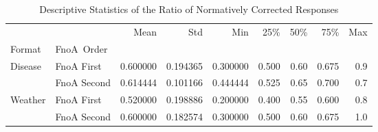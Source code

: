 \begin{table}[h!]
    \centering
    \caption{Descriptive Statistics of the Ratio of Normatively Corrected Responses}
    \label{descriptives}
        \begin{tabular}{llrrrrrrr}
        \toprule
                &             &        Mean &       Std &       Min &    25\% &   50\% &    75\% &  Max \\
        Format & FnoA\ Order &                 &           &           &        &       &        &      \\
        \midrule
        Disease & FnoA First &     0.600000 &  0.194365 &  0.300000 &  0.500 &  0.60 &  0.675 &  0.9 \\
                & FnoA Second &     0.614444 &  0.101166 &  0.444444 &  0.525 &  0.65 &  0.700 &  0.7 \\
        Weather & FnoA First &    0.520000 &  0.198886 &  0.200000 &  0.400 &  0.55 &  0.600 &  0.8 \\
                & FnoA Second &    0.600000 &  0.182574 &  0.300000 &  0.500 &  0.60 &  0.675 &  1.0 \\
        \bottomrule
        \end{tabular}
\end{table}


